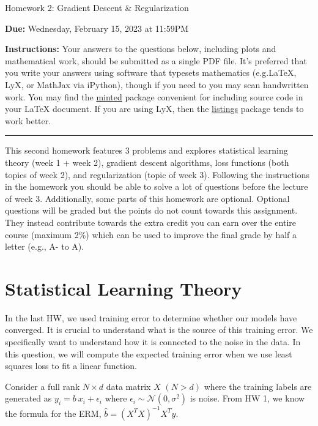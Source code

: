 \documentclass{article}
\newcommand{\ruleskip}{\bigskip\hrule\bigskip}
\begin{document}

\pagestyle{myheadings} 

\begin{center}
{\Large
Homework 2: Gradient Descent \& Regularization
} 
\end{center}

{
{ \color{nyupurple} \textbf{Due:} Wednesday, February 15, 2023 at 11:59PM} 
} 

\textbf{Instructions: }Your answers to the questions below, including plots and mathematical
 work, should be submitted as a single PDF file.  It's preferred that you write your answers using software that typesets mathematics (e.g.LaTeX, LyX, or MathJax via iPython), though if you need to you may scan handwritten work.  You may find the \href{https://github.com/gpoore/minted}{minted} package convenient for including source code in your LaTeX document.  If you are using LyX, then the \href{https://en.wikibooks.org/wiki/LaTeX/Source_Code_Listings}{listings} package tends to work better.

\ruleskip

This second homework features 3 problems and explores statistical learning theory (week 1 + week 2), gradient descent algorithms, loss functions (both topics of week 2), and regularization (topic of week 3). Following the instructions in the homework you should be able to solve a lot of questions before the lecture of week 3. Additionally, some parts of this homework are optional. Optional questions will be graded but the points do not count towards this assignment. They instead contribute towards the extra credit you can earn over the entire course (maximum 2\%) which can be used to improve the final grade by half a letter (e.g., A- to A). 

\section{\large Statistical Learning Theory}
In the last HW, we used training error to determine whether our models have converged. It is crucial to understand what is the source of this training error. We specifically want to understand how it is connected to the noise in the data. In this question, we will compute the expected training error when we use least squares loss to fit a linear function. 

Consider a full rank $N \times d$ data matrix $X$ $(N > d)$ where the training labels are generated as $y_i = b \: x_i + \epsilon_i$ where $\epsilon_i \sim \mathcal{N}(0, \sigma^2)$ is noise. From HW 1, we know the formula for the ERM, $\hat{b} = (X^TX)^{-1}X^Ty$.
\end{document}
